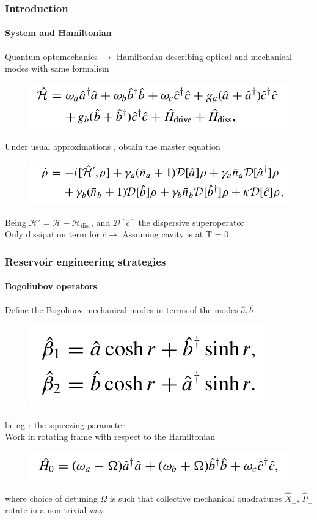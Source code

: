 \documentclass[aspectratio=43]{beamer}
\begin{document}
\begin{frame}
	
	\frametitle{Introduction}
	\framesubtitle{System and Hamiltonian}
	
	Quantum optomechanics $\longrightarrow$ Hamiltonian describing optical and mechanical modes with same formalism 
	\begin{figure}
		\includegraphics[width = 8 cm]{plots/hamiltonian_1.png}
	\end{figure}
	
	Under usual approximations {\color{blue}}, obtain the master equation 
	\begin{figure}
		\includegraphics[width = 8 cm]{plots/master_eq_1.png}
	\end{figure}

	Being $\mathcal{H}' = \mathcal{H} - \mathcal{H}_{\textrm{diss}}$, and $\mathcal{D}[\hat{c}]$ the dispersive superoperator\\
	Only dissipation term for $\hat{c} \longrightarrow$ {\color{blue}Assuming cavity is at T = 0}
	
\end{frame}

\begin{frame}
	
	\frametitle{Reservoir engineering strategies}
	\framesubtitle{Bogoliubov operators}
	
	Define the {\color{blue}Bogoliuov} mechanical modes in terms of the modes $\hat{a}, \hat{b}$
	\begin{figure}
		\includegraphics[width = 4.5 cm]{plots/bogoliubov_1.png}
	\end{figure}	

	being r the {\color{blue}squeezing parameter}\\
	Work in rotating frame with respect to the Hamiltonian
	\begin{figure}
		\includegraphics[width = 8 cm]{plots/hamiltonian_2.png}
	\end{figure}	

	where choice of detuning $\Omega$ is such that collective mechanical quadratures $\hat{X}_{\pm}$, $\hat{P}_{\pm}$ rotate in a non-trivial way

\end{frame}
\end{document}

